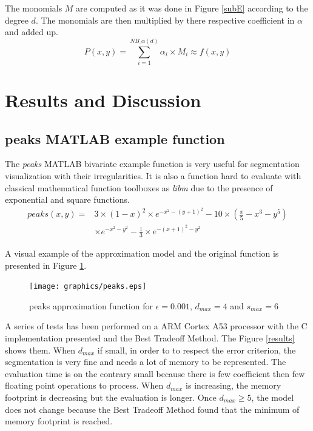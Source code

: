 \documentclass[fleqn,10pt]{SelfArx} %
\begin{document}
The monomials $M$ are computed as it was done in Figure \ref{subE} according to the degree $d$. The monomials are then multiplied by there respective coefficient in $\alpha$ and added up.
\begin{equation*}
P(x, y) = \sum_{i = 1}^{NB\_\alpha(d)} \alpha_i \times M_i \approx f(x, y)
\end{equation*}

\section{Results and Discussion}
\subsection{peaks MATLAB example function}
The \emph{peaks} MATLAB bivariate example function is very useful for segmentation visualization with their irregularities. It is also a function hard to evaluate with classical mathematical function toolboxes as \emph{libm} due to the presence of exponential and square functions.
\begin{equation*}
\begin{split}
peaks(x, y) = & 3\times (1-x)^2 \times e^{-x^2 - (y+1)^2} - 10 \times (\frac{x}{5} - x^3 - y^5) \\
              & \times e^{-x^2-y^2} - \frac{1}{3} \times e^{-(x+1)^2 - y^2}
\end{split}
\end{equation*}

A visual example of the approximation model and the original function is presented in Figure \ref{peaks}. 
\begin{figure}[h]
\centering
\texttt{[image: graphics/peaks.eps]}
\caption{peaks approximation function for $\epsilon = 0.001$, $d_{max} = 4$ and $s_{max} = 6$}
\label{peaks}
\end{figure}

A series of tests has been performed on a ARM Cortex A53 processor with the C implementation presented and the Best Tradeoff Method. The Figure \ref{results} shows them.
When $d_{max}$ if small, in order to to respect the error criterion, the segmentation is very fine and needs a lot of memory to be represented. The evaluation time is on the contrary small because there is few coefficient then few floating point operations to process. 
When $d_{max}$ is increasing, the memory footprint is decreasing but the evaluation is longer.
Once $d_{max} \geq 5$, the model does not change because the Best Tradeoff Method found that the minimum of memory footprint is reached.
\end{document}
